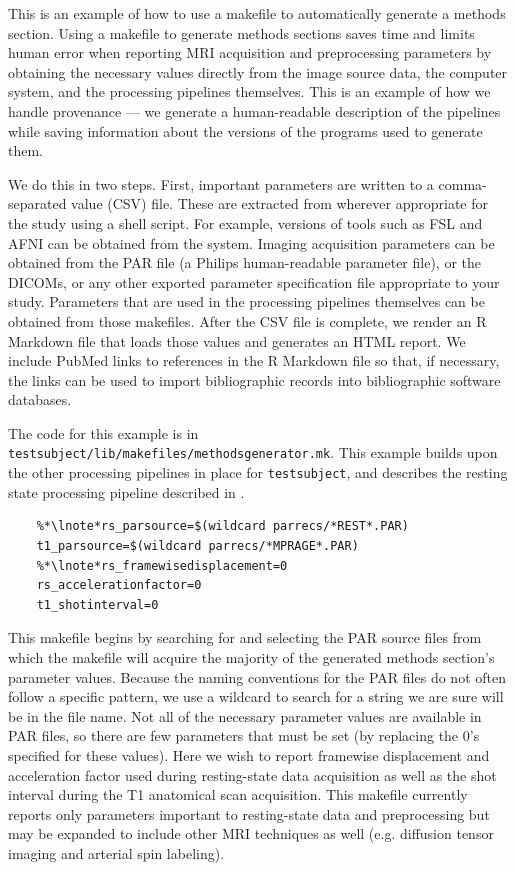 \label{sec:provenance}
This is an example of how to use a makefile to automatically generate a methods section. Using a makefile to generate methods sections saves time and limits human error when reporting MRI acquisition and preprocessing parameters by obtaining the necessary values directly from the image source data, the computer system, and the processing pipelines themselves. This is an example of how we handle provenance --- we generate a human-readable description of the pipelines while saving information about the versions of the programs used to generate them. 

We do this in two steps. First, important parameters are written to a comma-separated value (CSV) file. These are extracted from wherever appropriate for the study using a \bashn{} shell script. For example, versions of tools such as FSL and AFNI can be obtained from the system. Imaging acquisition parameters can be obtained from the PAR file (a Philips human-readable parameter file), or the DICOMs, or any other exported parameter specification file appropriate to your study. Parameters that are used in the processing pipelines themselves can be obtained from those makefiles. After the CSV file is complete, we render an R Markdown file that loads those values and generates an HTML report. We include PubMed links to references in the R Markdown file so that, if necessary, the links can be used to import bibliographic records into bibliographic software databases. 

The code for this example is in \texttt{testsubject/lib/makefiles/methodsgenerator.mk}.  This example builds upon the other processing pipelines in place for \texttt{testsubject}, and describes the resting state processing pipeline described in .


\begin{lstlisting}
	%*\lnote*rs_parsource=$(wildcard parrecs/*REST*.PAR)
	t1_parsource=$(wildcard parrecs/*MPRAGE*.PAR)
	%*\lnote*rs_framewisedisplacement=0
	rs_accelerationfactor=0
	t1_shotinterval=0
\end{lstlisting}

This makefile begins by  searching for and selecting the PAR source files from which the makefile will acquire the majority of the generated methods section's parameter values. Because the naming conventions for the PAR files do not often follow a specific pattern, we use a wildcard to search for a string we are sure will be in the file name.  Not all of the necessary parameter values are available in PAR files, so there are few parameters that must be set (by replacing the 0's specified for these values). Here we wish to report framewise displacement and acceleration factor used during resting-state data acquisition as well as the shot interval during the T1 anatomical scan acquisition. This makefile currently reports only parameters important to resting-state data and preprocessing but may be expanded to include other MRI techniques as well (e.g. diffusion tensor imaging and arterial spin labeling).

